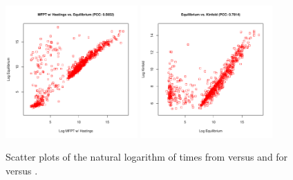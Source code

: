 \begin{figure}[!ht]
\centering
\includegraphics[width=0.45\textwidth]{Figures/Hermes/rnaMfptHastingsRnaEq.pdf}
\quad
\includegraphics[width=0.45\textwidth]{Figures/Hermes/rnaEqKinfold.pdf}
\caption{ Scatter plots of the natural logarithm of times from \rnamfpt
versus  and for \kinfold versus
. }
\label{fig:hermes:scatterplotRnaEqVsRnaMfptHastingsAndKinfold}
\end{figure}

